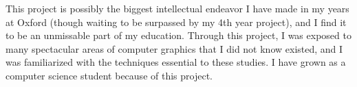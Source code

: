 This project is possibly the biggest intellectual endeavor I have made in my years at Oxford (though waiting to be surpassed by my 4th year project), and I find it to be an unmissable part of my education. Through this project, I was exposed to many spectacular areas of computer graphics that I did not know existed, and I was familiarized with the techniques essential to these studies. I have grown as a computer science student because of this project.